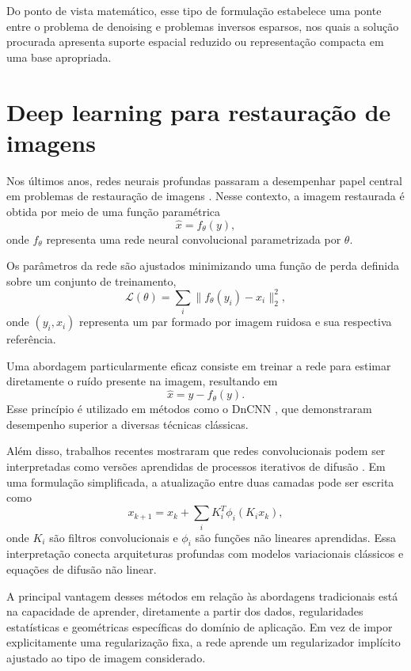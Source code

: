 \documentclass[
        oneside,      %
        english,			
        brazil			 
        ]{abntbibufjf}
\begin{document}
Do ponto de vista matemático, esse tipo de formulação estabelece uma ponte entre o problema de denoising e problemas inversos esparsos, nos quais a solução procurada apresenta suporte espacial reduzido ou representação compacta em uma base apropriada.

\section{Deep learning para restauração de imagens}

Nos últimos anos, redes neurais profundas passaram a desempenhar papel central em problemas de restauração de imagens \cite{goodfellow2016deep}. Nesse contexto, a imagem restaurada é obtida por meio de uma função paramétrica
\begin{equation}
\hat{x} = f_\theta(y),
\end{equation}
onde $f_\theta$ representa uma rede neural convolucional parametrizada por $\theta$.

Os parâmetros da rede são ajustados minimizando uma função de perda definida sobre um conjunto de treinamento,
\begin{equation}
\mathcal{L}(\theta)
=
\sum_i
\|f_\theta(y_i)-x_i\|_2^2,
\end{equation}
onde $(y_i,x_i)$ representa um par formado por imagem ruidosa e sua respectiva referência.

Uma abordagem particularmente eficaz consiste em treinar a rede para estimar diretamente o ruído presente na imagem, resultando em
\begin{equation}
\hat{x} = y - f_\theta(y).
\end{equation}
Esse princípio é utilizado em métodos como o DnCNN \cite{zhang2017dncnn}, que demonstraram desempenho superior a diversas técnicas clássicas.

Além disso, trabalhos recentes mostraram que redes convolucionais podem ser interpretadas como versões aprendidas de processos iterativos de difusão \cite{chen2017reaction}. Em uma formulação simplificada, a atualização entre duas camadas pode ser escrita como
\begin{equation}
x_{k+1}
=
x_k +
\sum_i
K_i^T
\phi_i(K_i x_k),
\end{equation}
onde $K_i$ são filtros convolucionais e $\phi_i$ são funções não lineares aprendidas. Essa interpretação conecta arquiteturas profundas com modelos variacionais clássicos e equações de difusão não linear.

A principal vantagem desses métodos em relação às abordagens tradicionais está na capacidade de aprender, diretamente a partir dos dados, regularidades estatísticas e geométricas específicas do domínio de aplicação. Em vez de impor explicitamente uma regularização fixa, a rede aprende um regularizador implícito ajustado ao tipo de imagem considerado.
\end{document}

